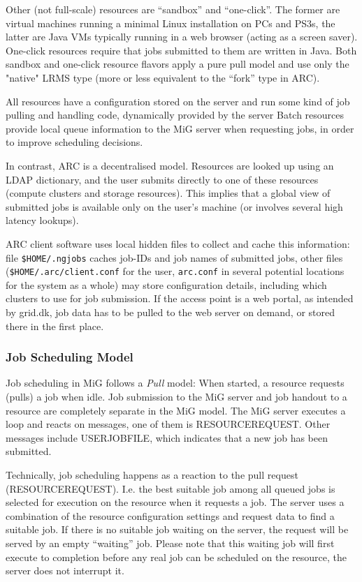 \documentclass[11pt]{article}
\begin{document}
Other (not full-scale) resources are ``sandbox'' and ``one-click''.
The former are virtual machines running a minimal Linux installation
on PCs and PS3s, the latter are Java VMs typically running in a web
browser (acting as a screen saver). One-click resources require that
jobs submitted to them are written in Java. 
%
Both sandbox and one-click resource flavors apply a pure pull model
and use only the "native" LRMS type (more or less equivalent to the
``fork'' type in ARC).

All resources have a configuration stored on the server and run some
kind of job pulling and handling code, dynamically provided by the server
Batch resources provide local queue information to the MiG server when
requesting jobs, in order to improve scheduling decisions.

In contrast, ARC is a decentralised model. Resources are looked up
using an LDAP dictionary, and the user submits directly to one of
these resources (compute clusters and storage resources). This implies
that a global view of submitted jobs is available only on the user's
machine (or involves several high latency lookups). 

ARC client software uses local hidden files to collect and cache this
information: file \texttt{\${}HOME/.ngjobs} caches job-IDs and job
names of submitted jobs, other files
(\texttt{\${}HOME/.arc/client.conf} for the user, \texttt{arc.conf} in
several potential locations for the system as a whole) may store
configuration details, including which clusters to use for job
submission.
%
If the access point is a web portal, as intended by grid.dk, job data
has to be pulled to the web server on demand, or stored there in the
first place.


\subsubsection{Job Scheduling Model}

Job scheduling in MiG follows a \emph{Pull} model: When started, a
resource requests (pulls) a job when idle. 
Job submission to the MiG server
and job handout to a resource are completely separate in the MiG
model. 
The MiG server executes a loop and reacts on messages, one of them is
RESOURCEREQUEST. Other messages include USERJOBFILE, which indicates
that a new job has been submitted. 

Technically, job scheduling
happens as a reaction to the pull request (RESOURCEREQUEST). I.e. the
best suitable job among all queued jobs is selected for execution on the
resource when it requests a job. The server uses a combination of the
resource configuration settings and request data to find a suitable job.
%
If there is no suitable job
waiting on the server, the request will be served by an empty
``waiting'' job. Please note that this waiting job will first execute
to completion before any real job can be scheduled on the resource,
the server does not interrupt it. 
\end{document}
